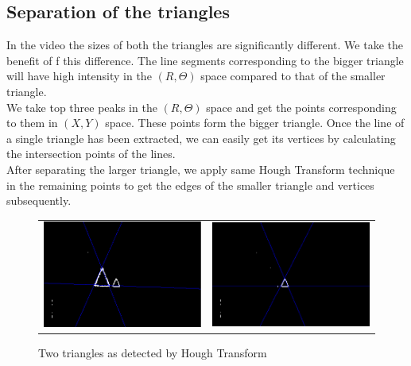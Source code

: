 \def\DevnagVersion{2.15}\documentclass[a4paper, 11pt, notitlepage]{report}
\begin{document}
\subsection{Separation of the triangles}
\hspace*{10pt} In the video the sizes of both the triangles are significantly different. We take the benefit of f this difference. The line segments corresponding to the bigger triangle will have high intensity in the $(R, \Theta)$ space compared to that of the smaller triangle.\\
\hspace*{10pt} We take top three peaks in the $(R, \Theta)$ space and get the points corresponding to them in $(X,Y)$ space. These points form the bigger triangle. Once the line of a single triangle has been extracted, we can easily get its vertices by calculating the intersection points of the lines.\\
\hspace*{10pt} After separating the larger triangle, we apply same Hough Transform technique in the remaining points to get the edges of the smaller triangle and vertices subsequently.\\

\begin{figure}[h]
\center
\begin{tabular}{cc}
\includegraphics[scale=0.30]{0002l.png} & 
\includegraphics[scale=0.30]{0002s.png}
\end{tabular}
\label{tab:gt}
\caption{Two triangles as detected by Hough Transform}
\end{figure}
\end{document}
